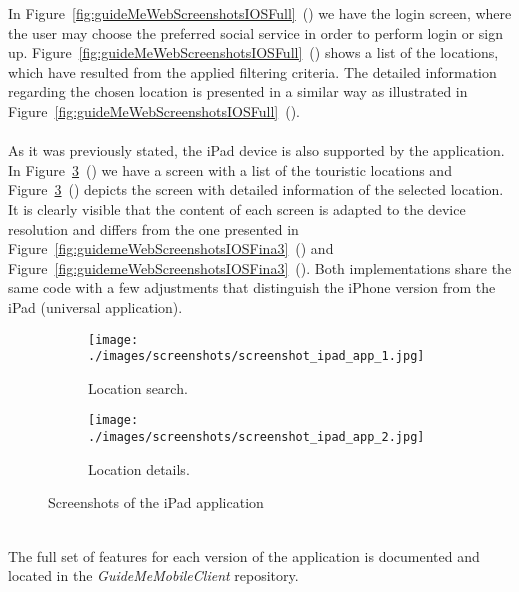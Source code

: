 In Figure~\ref{fig:guideMeWebScreenshotsIOSFull}~() we have the login screen, where the user may choose the preferred social service in order to perform login or sign up. Figure~\ref{fig:guideMeWebScreenshotsIOSFull}~() shows a list of the locations, which have resulted from the applied filtering criteria. The detailed information regarding the chosen location is presented in a similar way as illustrated in Figure~\ref{fig:guideMeWebScreenshotsIOSFull}~().\\
\\
As it was previously stated, the iPad device is also supported by the application. In Figure~\ref{fig:guideMeWebScreenshotsiPadFull}~() we have a screen with a list of the touristic locations and Figure~\ref{fig:guideMeWebScreenshotsiPadFull}~() depicts the screen with detailed information of the selected location. It is clearly visible that the content of each screen is adapted to the device resolution and differs from the one presented in Figure~\ref{fig:guidemeWebScreenshotsIOSFina3}~() and Figure~\ref{fig:guidemeWebScreenshotsIOSFina3}~(). Both implementations share the same code with a few adjustments that distinguish the iPhone version from the iPad (universal application).\\
\begin{figure}[h!]
\begin{center}
		\centering
        \begin{subfigure}[b]{0.45\textwidth}
 				\centering
                \texttt{[image: ./images/screenshots/screenshot\_ipad\_app\_1.jpg]}
                \caption{Location search.}
                \label{fig:guidemeWebScreenshotsiPadFina1}
        \end{subfigure}
        \begin{subfigure}[b]{0.45\textwidth}
 				\centering
                \texttt{[image: ./images/screenshots/screenshot\_ipad\_app\_2.jpg]}
                \caption{Location details.}
                \label{fig:guidemeWebScreenshotsiPadFina2}
        \end{subfigure}
        \caption{Screenshots of the iPad application}
        \label{fig:guideMeWebScreenshotsiPadFull}
        \end{center}
\end{figure}\\
The full set of features for each version of the application is documented and located in the \emph{GuideMeMobileClient} repository.

